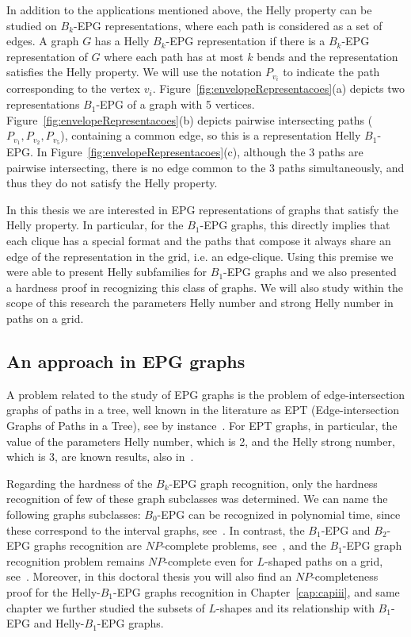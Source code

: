 In addition to the applications mentioned above, the Helly property can be studied on  $ B_k$-EPG representations, where each path is considered as a set of edges. A  graph $ G $ has a Helly $B_k$-EPG representation if there is a $ B_k$-EPG representation of $ G $ where each path has at most $ k $ bends and the representation satisfies the Helly property.
We will use the  notation $ P_{v_i} $ to indicate the path corresponding to the  vertex $ v_i$.
Figure~\ref{fig:envelopeRepresentacoes}(a) depicts two representations $ B_1$-EPG of a graph with 5 vertices. Figure~\ref{fig:envelopeRepresentacoes}(b) depicts pairwise intersecting paths ($ P_{v_1}, P_{v_2}, P_{v_5} $), containing a common edge, so this is a representation Helly $B_1$-EPG. In Figure~\ref{fig:envelopeRepresentacoes}(c), although the 3 paths are pairwise intersecting, there is no edge common to the 3 paths simultaneously, and thus they do not satisfy the Helly property.



In this thesis we are interested in EPG representations of graphs that satisfy the Helly property. In particular, for the $ B_1$-EPG graphs, this directly implies that each clique has a special format and the paths that compose it always share an edge of the representation in the grid, i.e. an edge-clique. Using this premise we were able to present Helly subfamilies for $ B_1$-EPG graphs and we also presented a hardness proof  in recognizing this class of graphs.
 We will also study within the scope of this research the parameters Helly number and strong Helly number in paths on a grid.

\subsection{An approach in EPG graphs}

A problem related to the study of EPG graphs is the problem of edge-intersection graphs of paths in a tree, well known in the literature as EPT (Edge-intersection Graphs of Paths in a Tree), see by instance~\cite{gavril1974intersection, golumbic2004recognition}. For EPT graphs, in particular, the value of the parameters Helly number, which is 2, and the Helly strong number, which is 3, are known results, also in~\cite{golumbic2004recognition}.

Regarding the hardness of the $B_k$-EPG graph recognition, only the hardness recognition of few of these graph subclasses was determined. We can name the following graphs subclasses: $ B_0$-EPG can be recognized in polynomial time, since these correspond to the interval graphs, see~\cite{booth1976}. In contrast, the $ B_1$-EPG and $ B_2$-EPG graphs recognition are $ NP$-complete problems, see~\cite{heldt2014, martin2017}, and the $ B_1$-EPG graph recognition problem remains $ NP$-complete even  for $ L$-shaped paths on a grid, see~\cite{cameron2016edge}. Moreover, in this doctoral thesis you will also find an $ NP$-completeness proof  for the  Helly-$B_1$-EPG graphs recognition in Chapter~\ref{cap:capiii}, and same chapter we further studied the subsets of $L$-shapes and its relationship with $B_1$-EPG and Helly-$B_1$-EPG graphs.

